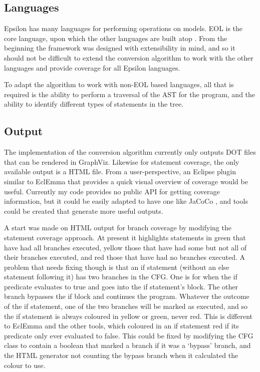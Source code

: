 \subsection{Languages}

Epsilon has many languages for performing operations on models. EOL is the core language, upon which the other languages are built atop \citep{epsilonBook}. From the beginning the framework was designed with extensibility in mind, and so it should not be difficult to extend the conversion algorithm to work with the other languages and provide coverage for all Epsilon languages.

To adapt the algorithm to work with non-EOL based languages, all that is required is the ability to perform a traversal of the AST for the program, and the ability to identify different types of statements in the tree.

\subsection{Output}
The implementation of the conversion algorithm currently only outputs DOT files that can be rendered in GraphViz. Likewise for statement coverage, the only available output is a HTML file. From a user-perspective, an Eclipse plugin similar to EclEmma that provides a quick visual overview of coverage would be useful. Currently my code provides no public API for getting coverage information, but it could be easily adapted to have one like JaCoCo \citep{JaCoCo}, and tools could be created that generate more useful outputs.

A start was made on HTML output for branch coverage by modifying the statement coverage approach. At present it highlights statements in green that have had all branches executed, yellow those that have had some but not all of their branches executed, and red those that have had no branches executed. A problem that needs fixing though is that an if statement (without an else statement following it) has two branches in the CFG. One is for when the if predicate evaluates to true and goes into the if statement's block. The other branch bypasses the if block and continues the program. Whatever the outcome of the if statement, one of the two branches will be marked as executed, and so the if statement is always coloured in yellow or green, never red. This is different to EclEmma and the other tools, which coloured in an if statement red if its predicate only ever evaluated to false. This could be fixed by modifying the CFG class to contain a boolean that marked a branch if it was a `bypass' branch, and the HTML generator not counting the bypass branch when it calculated the colour to use.

